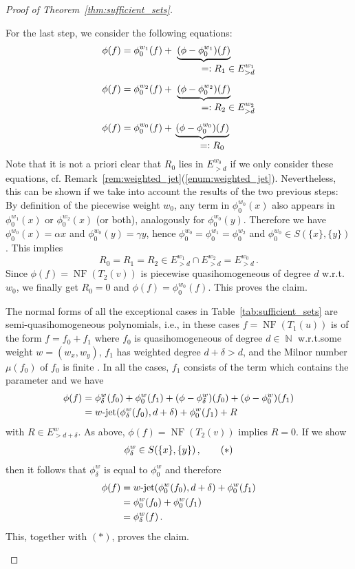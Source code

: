 \documentclass[noend]{amsproc}
\theoremstyle{definition}
\let\originalleft\left
\let\originalright\right
\renewcommand{\left}{\mathopen{}\mathclose\bgroup\originalleft}
\renewcommand{\right}{\aftergroup\egroup\originalright}
\newcommand{\myunderbrace}[3]{%
\makebox[\minof{0pt}{\widthof{$#1$}/2-\widthof{$#2$}/2-\widthof{$#3$}}]{}%
\underbrace{#1}_{\displaystyle\phantom{#3}#2 #3}}
\DeclareMathOperator{\N}{\mathbb{N}}
\DeclareMathOperator{\NF}{NF}
\DeclareMathOperator{\dash}{\!\textnormal{-}\!}
\DeclareMathOperator{\jet}{jet}
\begin{document}
\begin{proof}[Proof of Theorem~\ref{thm:sufficient_sets}]
\begin{description}[font=\normalfont\itshape,%
leftmargin=0cm,labelindent=\parindent]
For the last step, we consider the following equations:
\begin{align*}
\phi(f) &= \phi_0^{w_1}(f)
+\myunderbrace{(\phi-\phi_0^{w_1})(f)}{=}{: R_1 \in E_{>d}^{w_1}} \\[1ex]
\phi(f) &= \phi_0^{w_2}(f)
+\myunderbrace{(\phi-\phi_0^{w_2})(f)}{=}{: R_2 \in E_{>d}^{w_2}} \\[1ex]
\phi(f) &= \phi_0^{w_0}(f)
+\myunderbrace{(\phi-\phi_0^{w_0})(f)}{=}{: R_0}
\end{align*}
Note that it is not a priori clear that $R_0$ lies in $E_{>d}^{w_0}$ if we only
consider these equations, cf.\@
Remark~\ref{rem:weighted_jet}(\ref{enum:weighted_jet}). Nevertheless, this can
be shown if we take into account the results of the two previous steps: By
definition of the piecewise weight $w_0$, any term in $\phi_0^{w_0}(x)$ also
appears in $\phi_0^{w_1}(x)$ or $\phi_0^{w_2}(x)$ (or both), analogously for
$\phi_0^{w_0}(y)$. Therefore we have $\phi_0^{w_0}(x) = \alpha x$ and
$\phi_0^{w_0}(y) = \gamma y$, hence
$\phi_0^{w_0} = \phi_0^{w_1} = \phi_0^{w_2}$ and
$\phi_0^{w_0} \in S(\{x\}, \{y\})$. This implies
\[
R_0 = R_1 = R_2 \in E_{>d}^{w_1} \cap E_{>d}^{w_2} = E_{>d}^{w_0} \,.
\]
Since $\phi(f) = \NF(T_2(v))$ is piecewise quasihomogeneous of degree $d$
w.r.t.\@ $w_0$, we finally get $R_0 = 0$ and $\phi(f) = \phi_0^{w_0}(f)$. This
proves the claim.

\item[Exceptional cases]
The normal forms of all the exceptional cases in
Table~\ref{tab:sufficient_sets} are semi-quasihomogeneous polynomials, i.e., in
these cases $f = \NF(T_1(u))$ is of the form $f = f_0+f_1$ where $f_0$ is
quasihomogeneous of degree $d \in \N$ w.r.t.\@ some weight $w = (w_x, w_y)$,
$f_1$ has weighted degree $d+\delta > d$, and the Milnor number $\mu(f_0)$ of
$f_0$ is finite \citep[for the definition of the Milnor number, see][]{MS2013}.
In all the cases, $f_1$ consists of the term which contains the parameter and
we have
\begin{align*}
\phi(f) &= \phi_\delta^w(f_0) + \phi_0^w(f_1)
+ \left(\phi-\phi_\delta^w\right)(f_0) + \left(\phi-\phi_0^w\right)(f_1) \\
&= w\dash\jet(\phi_\delta^w(f_0), d+\delta) + \phi_0^w(f_1) + R
\end{align*}
with $R \in E_{>d+\delta}^w$. As above, $\phi(f) = \NF(T_2(v))$ implies
$R = 0$. If we show
\begin{align}
\phi_\delta^w \in S\left(\{x\}, \{y\}\right) \,, \tag{$\ast$}
\end{align}
then it follows that $\phi_\delta^w$ is equal to $\phi_0^w$ and therefore
\begin{align*}
\phi(f)
&= w\dash\jet(\phi_0^w(f_0), d+\delta) + \phi_0^w(f_1) \\
&= \phi_0^w(f_0)+\phi_0^w(f_1) \\
&= \phi_\delta^w(f) \,.
\end{align*}
This, together with $(\ast)$, proves the claim.


\end{description}
\end{proof}
\end{document}
